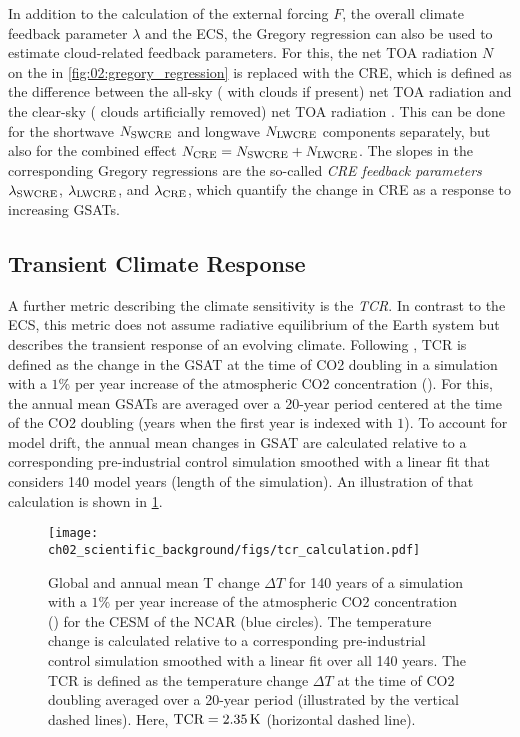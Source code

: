 In addition to the calculation of the external forcing $F$, the overall climate
feedback parameter $\lambda$ and the \ac{ECS}, the Gregory regression can also
be used to estimate cloud-related feedback parameters. For this, the net
\ac{TOA} radiation $N$ on the \yaxis{} in \cref{fig:02:gregory_regression} is
replaced with the \ac{CRE}, which is defined as the difference between the
all-sky (\ie{} with clouds if present) net \ac{TOA} radiation and the clear-sky
(\ie{} clouds artificially removed) net \ac{TOA} radiation
\autocite{Andrews2012}. This can be done for the shortwave $N_\mathtxt{SWCRE}$
and longwave $N_\mathtxt{LWCRE}$ components separately, but also for the
combined effect $N_\mathtxt{CRE} = N_\mathtxt{SWCRE} + N_\mathtxt{LWCRE}$. The
slopes in the corresponding Gregory regressions are the so-called
\emph{\ac{CRE} feedback parameters} $\lambda_\mathtxt{SWCRE}$,
$\lambda_\mathtxt{LWCRE}$, and $\lambda_\mathtxt{CRE}$, which quantify the
change in \ac{CRE} as a response to increasing \acp{GSAT}.


\subsection{Transient Climate Response}
\label{subsec:02:tcr}

A further metric describing the climate sensitivity is the \emph{\ac{TCR}}. In
contrast to the \ac{ECS}, this metric does not assume radiative equilibrium of
the Earth system but describes the transient response of an evolving climate.
Following \textcite{Bindoff2013}, \ac{TCR} is defined as the change in the
\ac{GSAT} at the time of \ac{CO2} doubling in a simulation with a $1 \unit{\%}$
per year increase of the atmospheric \ac{CO2} concentration (\onepctcotwo{}).
For this, the annual mean \acp{GSAT} are averaged over a 20-year period
centered at the time of the \ac{CO2} doubling (years  when the
first year is indexed with $1$). To account for model drift, the annual mean
changes in \ac{GSAT} are calculated relative to a corresponding pre-industrial
control simulation smoothed with a linear fit that considers 140 model years
(length of the \onepctcotwo{} simulation). An illustration of that calculation
is shown in \cref{fig:02:tcr}.

\begin{figure}[t]
  \centering
  \texttt{[image: 
    ch02\_scientific\_background/figs/tcr\_calculation.pdf]}
  \caption[
    Illustration of the definition of the \acf{TCR}.
  ]{
    Global and annual mean \acl{T} change $\Delta T$ for 140 years of a
    simulation with a $1 \unit{\%}$ per year increase of the atmospheric
    \acs{CO2} concentration (\onepctcotwo{}) for the \acf{CESM} of the
    \acf{NCAR} (blue circles). The temperature change is calculated relative to
    a corresponding pre-industrial control simulation smoothed with a linear
    fit over all 140 years. The \acf{TCR} is defined as the temperature change
    $\Delta T$ at the time of \acs{CO2} doubling averaged over a 20-year period
    (illustrated by the vertical dashed lines). Here, $\mathtxt{TCR} = 2.35
    \unit{K}$ (horizontal dashed line).
  }
  \label{fig:02:tcr}
\end{figure}

